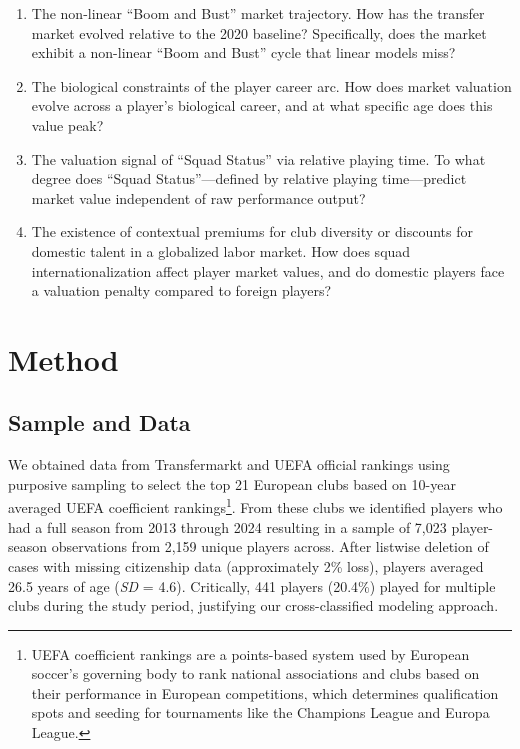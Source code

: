 \documentclass[
  12pt,
]{article}
\providecommand{\tightlist}{%
  \setlength{\itemsep}{0pt}\setlength{\parskip}{0pt}}\usepackage{longtable,booktabs,array}
\begin{document}
\begin{enumerate}
\def\labelenumi{\arabic{enumi}.}
\tightlist
\item
  The non-linear ``Boom and Bust'' market trajectory. How has the
  transfer market evolved relative to the 2020 baseline? Specifically,
  does the market exhibit a non-linear ``Boom and Bust'' cycle that
  linear models miss?
\item
  The biological constraints of the player career arc. How does market
  valuation evolve across a player's biological career, and at what
  specific age does this value peak?
\item
  The valuation signal of ``Squad Status'' via relative playing time. To
  what degree does ``Squad Status''---defined by relative playing
  time---predict market value independent of raw performance output?
\item
  The existence of contextual premiums for club diversity or discounts
  for domestic talent in a globalized labor market. How does squad
  internationalization affect player market values, and do domestic
  players face a valuation penalty compared to foreign players?
\end{enumerate}

\section{Method}\label{method}

\subsection{Sample and Data}\label{sample-and-data}

We obtained data from Transfermarkt and UEFA official rankings using
purposive sampling to select the top 21 European clubs based on 10-year
averaged UEFA coefficient rankings\footnote{UEFA coefficient rankings
  are a points-based system used by European soccer's governing body to
  rank national associations and clubs based on their performance in
  European competitions, which determines qualification spots and
  seeding for tournaments like the Champions League and Europa League.}.
From these clubs we identified players who had a full season from 2013
through 2024 resulting in a sample of 7,023 player-season observations
from 2,159 unique players across. After listwise deletion of cases with
missing citizenship data (approximately 2\% loss), players averaged 26.5
years of age (\emph{SD} = 4.6). Critically, 441 players (20.4\%) played
for multiple clubs during the study period, justifying our
cross-classified modeling approach.
\end{document}
